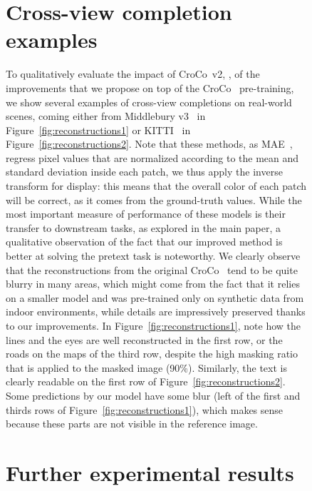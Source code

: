 \documentclass[10pt,twocolumn,letterpaper]{article}
\newcommand{\croconew}{CroCo~v2\xspace}
\begin{document}
\begin{figure}
{\begin{center}
\section{Cross-view completion examples}
\label{app:crocovis}

To qualitatively evaluate the impact of \croconew, \ie, of the improvements that we propose on top of the CroCo~\cite{croco} pre-training, we show several examples of cross-view completions on real-world scenes, coming either from Middlebury v3~\cite{middlebury} in Figure~\ref{fig:reconstructions1} or KITTI~\cite{kitti15} in Figure~\ref{fig:reconstructions2}.
Note that these methods, as MAE~\cite{mae}, regress pixel values that are normalized according to the mean and standard deviation inside each patch, we thus apply the inverse transform for display: this means that the overall color of each patch will be correct, as it comes from the ground-truth values.
While the most important measure of performance of these models is their transfer to downstream tasks, as explored in the main paper, a qualitative observation of the fact that our improved method is better at solving the pretext task is noteworthy.
We clearly observe that the reconstructions from the original CroCo~\cite{croco} tend to be quite blurry in many areas, which might come from the fact that it relies on a smaller model and was pre-trained only on synthetic data from indoor environments, while details are impressively preserved thanks to our improvements. 
In Figure~\ref{fig:reconstructions1}, note how the lines and the eyes are well reconstructed in the first row, or the roads on the maps of the third row, despite the high masking ratio that is applied to the masked image (90\%).
Similarly, the text is clearly readable on the first row of Figure~\ref{fig:reconstructions2}. Some predictions by our model have some blur (\eg left of the first and thirds rows of Figure~\ref{fig:reconstructions1}), which makes sense because these parts are not visible in the reference image.


\section{Further experimental results}
\label{app:morexp}



\end{center}}
\end{figure}
\end{document}
